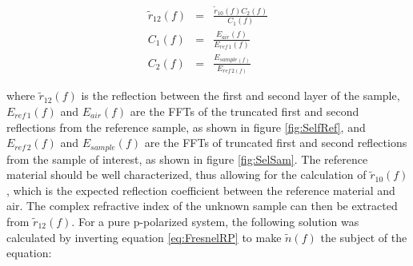 \begin{eqnarray}
\widetilde{r}_{12}(f) &=& \frac{\widetilde{r}_{10}(f)C_{2}(f)}{C_{1}(f)}\label{eq:SelfR}\\
C_{1}(f) &=& \frac{E_{air}(f)}{E_{ref\,1}(f)}\\
C_{2}(f) &=& \frac{E_{sample(f)}}{E_{ref\,2(f)}}
\label{eq:Self}
\end{eqnarray}

where $\widetilde{r}_{12}(f)$ is the reflection between the first and second layer of the sample, $E_{ref\,1}(f)$ and $E_{air}(f)$ are the FFTs of the truncated first and second reflections from the reference sample, as shown in figure \ref{fig:SelfRef}, and $E_{ref\,2}(f)$ and $E_{sample}(f)$ are the FFTs of truncated first and second reflections from the sample of interest, as shown in figure \ref{fig:SelSam}.
The reference material should be well characterized, thus allowing for the calculation of $\widetilde{r}_{10}(f)$, which is the expected reflection coefficient between the reference material and air. The complex refractive index of the unknown sample can then be extracted from $\widetilde{r}_{12}(f)$. For a pure p-polarized system, the following solution was calculated by inverting equation \ref{eq:FresnelRP} to make $\widetilde{n}(f)$ the subject of the equation:

